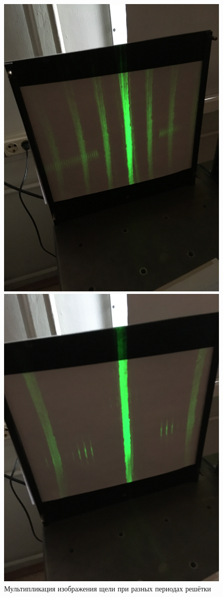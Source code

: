 \documentclass[a4paper]{article}
\begin{document}
\begin{figure}[tbp]
	\centering
	\begin{minipage}{0.49\linewidth}
		\centering
		\includegraphics[width=0.8\linewidth]{IMG_3269}
	\end{minipage}
	\begin{minipage}{0.49\linewidth}
		\centering
		\includegraphics[width=0.8\linewidth]{IMG_3270}
	\end{minipage}
	\caption{Мультипликация изображения щели при разных периодах решётки}
	\label{fig:мультипликация}
\end{figure}
\newpage
\end{document}
